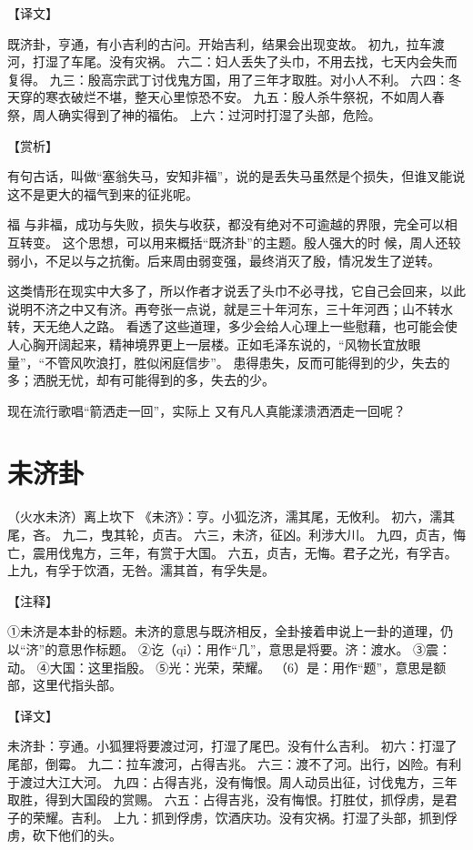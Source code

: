 \documentclass[a4paper,12pt,UTF8,twoside]{ctexbook}
\begin{document}
【译文】

既济卦，亨通，有小吉利的古问。开始吉利，结果会出现变故。
初九，拉车渡河，打湿了车尾。没有灾祸。
六二：妇人丢失了头巾，不用去找，七天内会失而复得。
九三：殷高宗武丁讨伐鬼方国，用了三年才取胜。对小人不利。
六四：冬天穿的寒衣破烂不堪，整天心里惊恐不安。
九五：殷人杀牛祭祝，不如周人春祭，周人确实得到了神的福佑。
上六：过河时打湿了头部，危险。

【赏析】

有句古话，叫做“塞翁失马，安知非福”，说的是丢失马虽然是个损失，但谁叉能说这不是更大的福气到来的征兆呢。

福 与非福，成功与失败，损失与收获，都没有绝对不可逾越的界限，完全可以相互转变。 这个思想，可以用来概括“既济卦”的主题。殷人强大的时 候，周人还较弱小，不足以与之抗衡。后来周由弱变强，最终消灭了殷，情况发生了逆转。

这类情形在现实中大多了，所以作者才说丢了头巾不必寻找，它自己会回来，以此说明不济之中又有济。再夸张一点说，就是三十年河东，三十年河西；山不转水转，天无绝人之路。 看透了这些道理，多少会给人心理上一些慰藉，也可能会使人心胸开阔起来，精神境界更上一层楼。正如毛泽东说的，“风物长宜放眼量”，“不管风吹浪打，胜似闲庭信步”。 患得患失，反而可能得到的少，失去的多；洒脱无忧，却有可能得到的多，失去的少。

现在流行歌唱“箭洒走一回”，实际上 又有凡人真能漾溃洒洒走一回呢？

\chapter{未济卦}

（火水未济）离上坎下
《未济》：亨。小狐汔济，濡其尾，无攸利。
初六，濡其尾，吝。
九二，曳其轮，贞吉。
六三，未济，征凶。利涉大川。
九四，贞吉，悔亡，震用伐鬼方，三年，有赏于大国。
六五，贞吉，无悔。君子之光，有孚吉。
上九，有孚于饮酒，无咎。濡其首，有孚失是。

【注释】

①未济是本卦的标题。未济的意思与既济相反，全卦接着申说上一卦的道理，仍以“济”的意思作标题。
②讫（qi）：用作“几”，意思是将要。济：渡水。
③震：动。
④大国：这里指殷。
⑤光：光荣，荣耀。
（6）是：用作“题”，意思是额部，这里代指头部。

【译文】

未济卦：亨通。小狐狸将要渡过河，打湿了尾巴。没有什么吉利。
初六：打湿了尾部，倒霉。
九二：拉车渡河，占得吉兆。
六三：渡不了河。出行，凶险。有利于渡过大江大河。
九四：占得吉兆，没有悔恨。周人动员出征，讨伐鬼方，三年取胜，得到大国段的赏赐。
六五：占得吉兆，没有悔恨。打胜仗，抓俘虏，是君子的荣耀。吉利。
上九：抓到俘虏，饮酒庆功。没有灾祸。打湿了头部，抓到俘虏，砍下他们的头。
\end{document}
